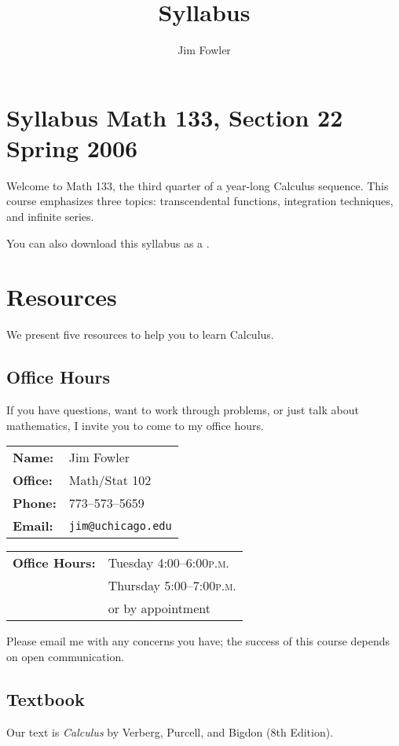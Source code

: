 \documentclass[12pt,letterpaper]{article}
\title{Syllabus}
\author{Jim Fowler}
\newcommand{\peem}{\textsc{p.m.}}
\begin{document}
\section*{\Large\sf Syllabus\hfill
Math 133, Section 22\hfill
Spring 2006}

Welcome to Math 133, the third quarter of a year-long Calculus
sequence.  This course emphasizes three topics: transcendental
functions, integration techniques, and infinite series.

\begin{htmlonly}
You can also download this syllabus as a .
\end{htmlonly}

\section*{Resources}

We present five resources to help you to learn Calculus.

\subsection*{Office Hours}
If you have questions, want to work through problems, or just talk
about mathematics, I invite you to come to my office hours.
\begin{multicols}{2}
\begin{tabular}{ll}
\textbf{Name:} & Jim Fowler \\
\textbf{Office:} & Math/Stat 102 \\
\textbf{Phone:} & 773--573--5659 \\
\textbf{Email:} & \texttt{jim@uchicago.edu}
\end{tabular}

\begin{tabular}{ll}
\textbf{Office Hours:} & Tuesday 4:00--6:00\peem \\
& Thursday 5:00--7:00\peem \\
& or by appointment
\end{tabular}
\end{multicols}
\noindent
Please email me with any concerns you have; the success of this course
depends on open communication.

\subsection*{Textbook}
Our text is \textit{Calculus} by Verberg, Purcell, and Bigdon (8th
Edition).
\end{document}

